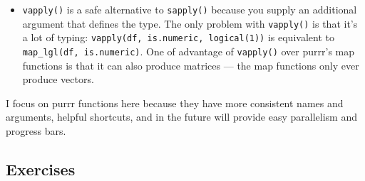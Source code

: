 \documentclass[]{book}
\newenvironment{Shaded}{\begin{snugshade}}{\end{snugshade}}
\newcommand{\KeywordTok}[1]{\textcolor[rgb]{0.13,0.29,0.53}{\textbf{{#1}}}}
\newcommand{\DataTypeTok}[1]{\textcolor[rgb]{0.13,0.29,0.53}{{#1}}}
\newcommand{\FloatTok}[1]{\textcolor[rgb]{0.00,0.00,0.81}{{#1}}}
\newcommand{\StringTok}[1]{\textcolor[rgb]{0.31,0.60,0.02}{{#1}}}
\newcommand{\CommentTok}[1]{\textcolor[rgb]{0.56,0.35,0.01}{\textit{{#1}}}}
\newcommand{\NormalTok}[1]{{#1}}
\begin{document}
\begin{itemize}
\begin{Shaded}
\end{Shaded}
\item
  \texttt{vapply()} is a safe alternative to \texttt{sapply()} because
  you supply an additional argument that defines the type. The only
  problem with \texttt{vapply()} is that it's a lot of typing:
  \texttt{vapply(df,\ is.numeric,\ logical(1))} is equivalent to
  \texttt{map\_lgl(df,\ is.numeric)}. One of advantage of
  \texttt{vapply()} over purrr's map functions is that it can also
  produce matrices --- the map functions only ever produce vectors.
\end{itemize}

I focus on purrr functions here because they have more consistent names
and arguments, helpful shortcuts, and in the future will provide easy
parallelism and progress bars.

\subsection{Exercises}\label{exercises-58}
\end{document}
